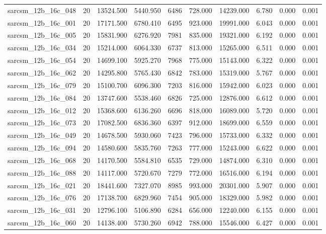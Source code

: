 \begin{tabular}{lrrrrrrrrr}
sarcsm\_12b\_16c\_048 & 20 & 13524.500 & 5440.950 & 6486 & 728.000 & 14239.000 & 6.780 & 0.000 & 0.001 \\
sarcsm\_12b\_16c\_001 & 20 & 17171.500 & 6780.410 & 6495 & 923.000 & 19991.000 & 6.043 & 0.000 & 0.001 \\
sarcsm\_12b\_16c\_005 & 20 & 15831.900 & 6276.920 & 7981 & 835.000 & 19321.000 & 6.192 & 0.000 & 0.001 \\
sarcsm\_12b\_16c\_034 & 20 & 15214.000 & 6064.330 & 6737 & 813.000 & 15265.000 & 6.511 & 0.000 & 0.001 \\
sarcsm\_12b\_16c\_054 & 20 & 14699.100 & 5925.270 & 7968 & 775.000 & 15143.000 & 6.322 & 0.000 & 0.001 \\
sarcsm\_12b\_16c\_062 & 20 & 14295.800 & 5765.430 & 6842 & 783.000 & 15319.000 & 5.767 & 0.000 & 0.001 \\
sarcsm\_12b\_16c\_079 & 20 & 15100.700 & 6096.300 & 7203 & 816.000 & 15942.000 & 6.023 & 0.000 & 0.001 \\
sarcsm\_12b\_16c\_084 & 20 & 13747.600 & 5538.460 & 6826 & 725.000 & 12876.000 & 6.612 & 0.000 & 0.001 \\
sarcsm\_12b\_16c\_012 & 20 & 15368.600 & 6136.260 & 6696 & 818.000 & 16089.000 & 5.720 & 0.000 & 0.001 \\
sarcsm\_12b\_16c\_073 & 20 & 17082.500 & 6836.360 & 6397 & 912.000 & 18699.000 & 6.559 & 0.000 & 0.001 \\
sarcsm\_12b\_16c\_049 & 20 & 14678.500 & 5930.060 & 7423 & 796.000 & 15733.000 & 6.332 & 0.000 & 0.001 \\
sarcsm\_12b\_16c\_094 & 20 & 14580.600 & 5835.760 & 7263 & 777.000 & 15243.000 & 6.622 & 0.000 & 0.001 \\
sarcsm\_12b\_16c\_068 & 20 & 14170.500 & 5584.810 & 6535 & 729.000 & 14874.000 & 6.310 & 0.000 & 0.001 \\
sarcsm\_12b\_16c\_088 & 20 & 14117.000 & 5720.670 & 7279 & 772.000 & 16516.000 & 6.194 & 0.000 & 0.001 \\
sarcsm\_12b\_16c\_021 & 20 & 18441.600 & 7327.070 & 8985 & 993.000 & 20301.000 & 5.907 & 0.000 & 0.001 \\
sarcsm\_12b\_16c\_076 & 20 & 17138.700 & 6829.960 & 7454 & 905.000 & 18329.000 & 5.982 & 0.000 & 0.001 \\
sarcsm\_12b\_16c\_031 & 20 & 12796.100 & 5106.890 & 6284 & 656.000 & 12240.000 & 6.155 & 0.000 & 0.001 \\
sarcsm\_12b\_16c\_060 & 20 & 14138.400 & 5730.260 & 6942 & 788.000 & 15546.000 & 6.427 & 0.000 & 0.001 \\

\end{tabular}
